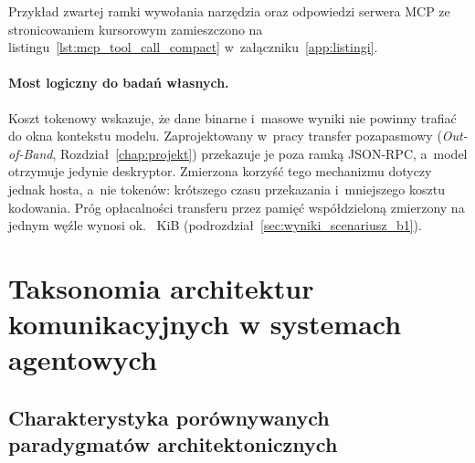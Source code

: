 Przykład zwartej ramki wywołania narzędzia oraz odpowiedzi serwera MCP ze stronicowaniem kursorowym zamieszczono na listingu~\ref{lst:mcp_tool_call_compact} w~załączniku~\ref{app:listingi}.

\paragraph{Most logiczny do badań własnych.}
Koszt tokenowy wskazuje, że dane binarne i~masowe wyniki nie powinny trafiać do okna kontekstu modelu. Zaprojektowany w~pracy transfer pozapasmowy (\emph{Out-of-Band}, Rozdział~\ref{chap:projekt}) przekazuje je poza ramką JSON-RPC, a~model otrzymuje jedynie deskryptor. Zmierzona korzyść tego mechanizmu dotyczy jednak hosta, a~nie tokenów: krótszego czasu przekazania i~mniejszego kosztu kodowania. Próg opłacalności transferu przez pamięć współdzieloną zmierzony na jednym węźle wynosi ok. \wynSstarLoopShm~KiB (podrozdział~\ref{sec:wyniki_scenariusz_b1}).


\section{Taksonomia architektur komunikacyjnych w systemach agentowych}
\label{sec:protokoly_zestawienie_architektur}

\subsection{Charakterystyka porównywanych paradygmatów architektonicznych}
\label{subsec:protokoly_paradygmaty}

